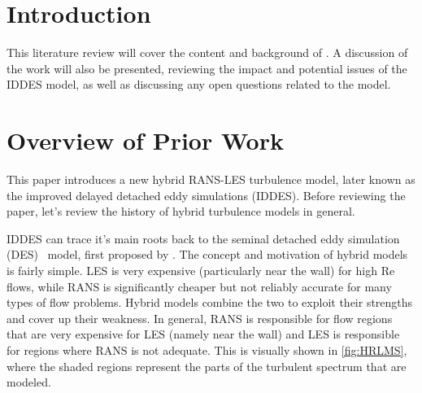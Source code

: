 \documentclass{ucb}
\begin{document}
\ucbcover{}

\section{Introduction}
This literature review will cover the content and background of \cite{shurHybridRANSLESApproach2008}. A discussion of the work will also be presented, reviewing the impact and potential issues of the IDDES model, as well as discussing any open questions related to the model.

\section{Overview of Prior Work}
This paper introduces a new hybrid RANS-LES turbulence model, later known as the improved delayed detached eddy simulations (IDDES). Before reviewing the paper, let's review the history of hybrid turbulence models in general.

IDDES can trace it's main roots back to the seminal detached eddy simulation (DES)~\cite{SpalartP.R.JouW-H.StreletsM.Allamaras1997} model, first proposed by \citeauthor{SpalartP.R.JouW-H.StreletsM.Allamaras1997}. The concept and motivation of hybrid models is fairly simple. LES is very expensive (particularly near the wall) for high Re flows, while RANS is significantly cheaper but not reliably accurate for many types of flow problems. Hybrid models combine the two to exploit their strengths and cover up their weakness. In general, RANS is responsible for flow regions that are very expensive for LES (namely near the wall) and LES is responsible for regions where RANS is not adequate. This is visually shown in \cref{fig:HRLMS}, where the shaded regions represent the parts of the turbulent spectrum that are modeled.
\end{document}
